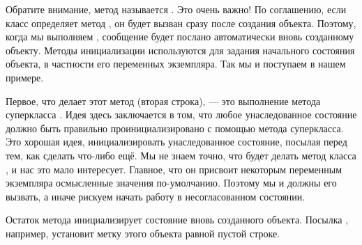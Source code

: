 \documentclass[a4paper,10pt,twoside]{book}
\begin{document}
Обратите внимание, метод называется .
Это очень важно!
По соглашению, если класс определяет метод , он будет вызван сразу после создания объекта.
Поэтому, когда мы выполняем , сообщение  будет послано автоматически вновь созданному объекту.
Методы инициализации используются для задания начального состояния объекта, в частности его переменных экземпляра. Так мы и поступаем в нашем примере.

Первое, что делает этот метод (вторая строка), --- это выполнение метода  суперкласса .
Идея здесь заключается в том, что любое унаследованное состояние должно быть правильно проинициализировано с помощью метода  суперкласса.
Это хорошая идея, инициализировать унаследованное состояние, посылая  перед тем, как сделать что-либо ещё. Мы не знаем точно, что будет делать метод  класса , и нас это мало интересует. Главное, что он присвоит некоторым переменным экземпляра осмысленные значения по-умолчанию. Поэтому мы и должны его вызвать, а иначе рискуем начать работу в несогласованном состоянии.

Остаток метода инициализирует состояние вновь созданного объекта.
Посылка , например, установит метку этого объекта равной пустой строке.
\end{document}
